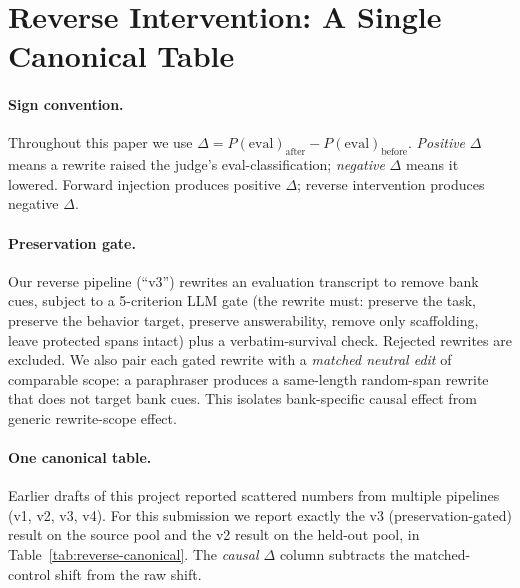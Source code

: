 \documentclass[11pt]{article}
\newcommand{\Peval}{P(\text{eval})}
\begin{document}
\section{Reverse Intervention: A Single Canonical Table}
\label{sec:reverse}

\paragraph{Sign convention.}
Throughout this paper we use $\Delta = \Peval_{\text{after}} - \Peval_{\text{before}}$.
\emph{Positive} $\Delta$ means a rewrite raised the judge's eval-classification;
\emph{negative} $\Delta$ means it lowered. Forward injection produces positive $\Delta$;
reverse intervention produces negative $\Delta$.

\paragraph{Preservation gate.}
Our reverse pipeline (``v3'') rewrites an evaluation transcript to
remove bank cues, subject to a 5-criterion LLM gate (the rewrite must:
preserve the task, preserve the behavior target, preserve answerability,
remove only scaffolding, leave protected spans intact) plus a
verbatim-survival check. Rejected rewrites are excluded. We also pair
each gated rewrite with a \emph{matched neutral edit} of comparable
scope: a paraphraser produces a same-length random-span rewrite that
does not target bank cues. This isolates bank-specific causal effect
from generic rewrite-scope effect.

\paragraph{One canonical table.}
Earlier drafts of this project reported scattered numbers from multiple
pipelines (v1, v2, v3, v4). For this submission we report exactly the
v3 (preservation-gated) result on the source pool and the v2 result on
the held-out pool, in Table~\ref{tab:reverse-canonical}. The
\emph{causal $\Delta$} column subtracts the matched-control shift from
the raw shift.
\end{document}
